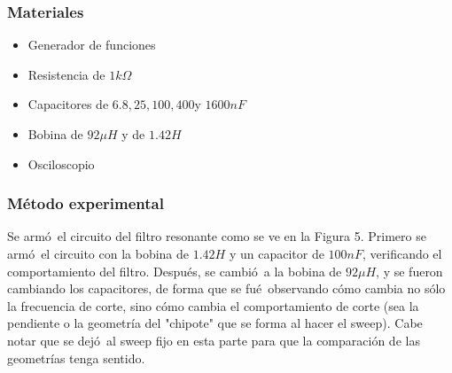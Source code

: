 \documentclass[11pt]{article}
\renewcommand{\=}[1]{\stackrel{#1}{=}} %
\theoremstyle{definition}
\theoremstyle{remark}
\begin{document}
\subsubsection{Materiales}
\begin{itemize}
\item Generador de funciones
\item Resistencia de $1k\Omega$
\item Capacitores de $6.8, 25, 100, 400 $y $1600nF$
\item Bobina de $92\mu H$ y de $1.42H$
\item Osciloscopio
\end{itemize}

\subsubsection{M\'etodo experimental}
Se arm\'o\ el circuito del filtro resonante como se ve en la Figura 5. Primero se arm\'o\ el circuito con la bobina de $1.42H$ y un capacitor de $100nF$, verificando el comportamiento del filtro. Despu\'es, se cambi\'o\ a la bobina de $92\mu H$, y se fueron cambiando los capacitores, de forma que se fu\'e\ observando c\'omo cambia no s\'olo la frecuencia de corte, sino c\'omo cambia el comportamiento de corte (sea la pendiente o la geometr\'ia del "chipote" que se forma al hacer el sweep). Cabe notar que se dej\'o\ al sweep fijo en esta parte para que la comparaci\'on de las geometr\'ias tenga sentido.
\end{document}
